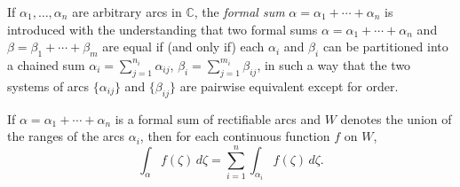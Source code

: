 If $\alpha_1, \ldots, \alpha_n$ are arbitrary arcs in $\mathbb{C}$, the \textit{formal sum} $\alpha = \alpha_1 + \cdots + \alpha_n$ is introduced with the understanding that two formal sums $\alpha = \alpha_1 + \cdots + \alpha_n$ and $\beta = \beta_1 + \cdots + \beta_m$ are equal if (and only if) each $\alpha_i$ and $\beta_i$ can be partitioned into a chained sum $\alpha_i = \sum_{j=1}^{n_i} \alpha_{ij}$, $\beta_i = \sum_{j=1}^{m_i} \beta_{ij}$, in such a way that the two systems of arcs $\{\alpha_{ij}\}$ and $\{\beta_{ij}\}$ are pairwise equivalent except for order.

If $\alpha = \alpha_1 + \cdots + \alpha_n$ is a formal sum of rectifiable arcs and $W$ denotes the union of the ranges of the arcs $\alpha_i$, then for each continuous function $f$ on $W$,
$$\int_\alpha f(\zeta) \, d\zeta = \sum_{i=1}^{n} \int_{\alpha_i} f(\zeta) \, d\zeta.$$
